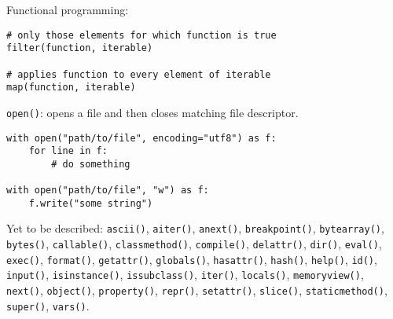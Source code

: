 Functional programming:
\begin{verbatim}
# only those elements for which function is true
filter(function, iterable)

# applies function to every element of iterable
map(function, iterable)
\end{verbatim}

\texttt{open()}: opens a file and then closes matching file descriptor.
\begin{verbatim}
with open("path/to/file", encoding="utf8") as f:
    for line in f:
        # do something

with open("path/to/file", "w") as f:
    f.write("some string")
\end{verbatim}

Yet to be described:
\texttt{ascii()},
\texttt{aiter()},
\texttt{anext()},
\texttt{breakpoint()},
\texttt{bytearray()},
\texttt{bytes()},
\texttt{callable()},
\texttt{classmethod()},
\texttt{compile()},
\texttt{delattr()},
\texttt{dir()},
\texttt{eval()},
\texttt{exec()},
\texttt{format()},
\texttt{getattr()},
\texttt{globals()},
\texttt{hasattr()},
\texttt{hash()},
\texttt{help()},
\texttt{id()},
\texttt{input()},
\texttt{isinstance()},
\texttt{issubclass()},
\texttt{iter()},
\texttt{locals()},
\texttt{memoryview()},
\texttt{next()},
\texttt{object()},
\texttt{property()},
\texttt{repr()},
\texttt{setattr()},
\texttt{slice()},
\texttt{staticmethod()},
\texttt{super()},
\texttt{vars()}.

%